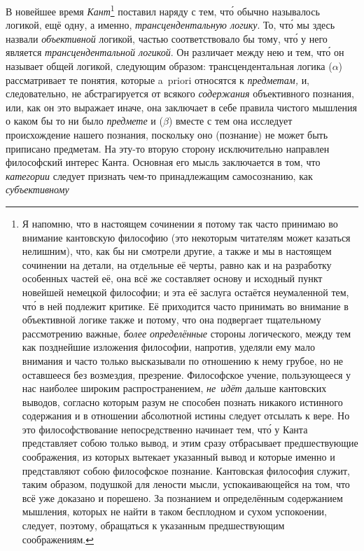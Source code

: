 В новейшее время {\em Кант}\footnote{
Я напомню, что в настоящем сочинении я потому так часто принимаю во
внимание кантовскую философию (это некоторым читателям может казаться
нелишним), что, как бы ни смотрели другие, а также и мы в настоящем
сочинении на детали, на отдельные её черты, равно как и на разработку
особенных частей её, она всё же составляет основу и исходный пункт новейшей
немецкой философии; и эта её заслуга остаётся неумаленной тем, чт\'{о} в ней
подлежит критике. Её приходится часто принимать во внимание в объективной
логике также и потому, что она подвергает тщательному рассмотрению важные,
{\em более определённые} стороны логического, между тем как
позднейшие изложения философии, напротив, уделяли ему мало внимания и часто
только высказывали по отношению к нему грубое, но не оставшееся без
возмездия, презрение. Философское учение, пользующееся у нас наиболее
широким распространением, {\em не~идёт} дальше кантовских
выводов, согласно которым разум не способен познать никакого истинного
содержания и в отношении абсолютной истины следует отсылать к вере. Но это
философствование непосредственно начинает тем, чт\'{о} у Канта представляет
собою только вывод, и этим сразу отбрасывает предшествующие соображения,
из которых вытекает указанный вывод и которые именно и представляют собою
философское познание. Кантовская философия служит, таким образом, подушкой
для лености мысли, успокаивающейся на том, что всё уже доказано и порешено.
За познанием и определённым содержанием мышления, которых не найти в таком
бесплодном и сухом успокоении, следует, поэтому, обращаться к указанным
предшествующим соображениям.} поставил наряду с тем,
чт\'{о} обычно называлось логикой, ещё одну, а именно,
{\em трансцендентальную логику}. То, чт\'{о} мы здесь
назвали {\em объективной} логикой, частью
соответствовало бы тому, чт\'{о} у него является
{\em трансцендентальной логикой}. Он различает между
нею и тем, чт\'{о} он называет общей логикой, следующим образом:
трансцендентальная логика ($\alpha$) рассматривает те понятия, которые
a~priori относятся к {\em предметам,} и, следовательно,
не абстрагируется от всякого {\em содержания}
объективного познания, или, как он это выражает иначе, она заключает в себе
правила чистого мышления о каком бы то ни было
{\em предмете} и ($\beta$) вместе с тем она исследует
происхождение нашего познания, поскольку оно (познание) не может быть
приписано предметам. На эту-то вторую сторону исключительно направлен
философский интерес Канта. Основная его мысль заключается в том, что
{\em категории} следует признать чем-то принадлежащим
самосознанию, как {\em субъективному}
